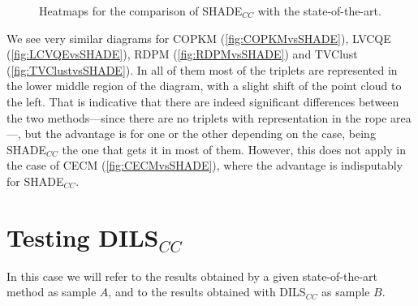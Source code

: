 \begin{figure}[bth]
	\myfloatalign
	 \quad
	 \quad
	\caption[Heatmaps for the comparison of SHADE$_{CC}$ with the state-of-the-art.]{Heatmaps for the comparison of \acs{SHADE}$_{CC}$ with the state-of-the-art.}
	\label{fig:HeatmapsSHADEvsSOTA}
\end{figure}

We see very similar diagrams for \acs{COPKM} (\ref{fig:COPKMvsSHADE}), LVCQE (\ref{fig:LCVQEvsSHADE}), \acs{RDPM} (\ref{fig:RDPMvsSHADE}) and \acs{TVClust} (\ref{fig:TVClustvsSHADE}). In all of them most of the triplets are represented in the lower middle region of the diagram, with a slight shift of the point cloud to the left. That is indicative that there are indeed significant differences between the two methods---since there are no triplets with representation in the rope area---, but the advantage is for one or the other depending on the case, being \acs{SHADE}$_{CC}$ the one that gets it in most of them. However, this does not apply in the case of \acs{CECM} (\ref{fig:CECMvsSHADE}), where the advantage is indisputably for \acs{SHADE}$_{CC}$.

\section{Testing DILS$_{CC}$} \label{sec:TestDILS}

In this case we will refer to the results obtained by a given state-of-the-art method as sample $A$, and to the results obtained with \acs{DILS}$_{CC}$ as sample $B$.

